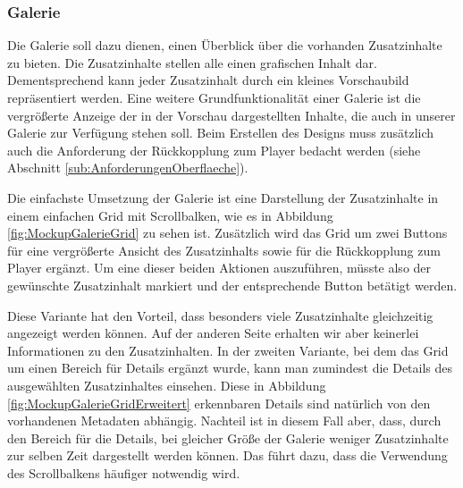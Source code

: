 

\subsubsection{Galerie}
Die Galerie soll dazu dienen, einen Überblick über die vorhanden Zusatzinhalte zu bieten. Die Zusatzinhalte stellen alle einen grafischen Inhalt dar. Dementsprechend kann jeder Zusatzinhalt durch ein kleines Vorschaubild repräsentiert werden. 
Eine weitere Grundfunktionalität einer Galerie ist die vergrößerte Anzeige der in der Vorschau dargestellten Inhalte, die auch in unserer Galerie zur Verfügung stehen soll. Beim Erstellen des Designs muss zusätzlich auch die Anforderung der Rückkopplung zum Player bedacht werden (siehe Abschnitt \ref{sub:AnforderungenOberflaeche}). 

Die einfachste Umsetzung der Galerie ist eine Darstellung der Zusatzinhalte in einem einfachen Grid  mit Scrollbalken, wie es in Abbildung \ref{fig:MockupGalerieGrid} zu sehen ist. Zusätzlich wird das Grid um zwei Buttons für eine vergrößerte Ansicht des Zusatzinhalts sowie für die Rückkopplung zum Player ergänzt. Um eine dieser beiden Aktionen auszuführen, müsste also der gewünschte Zusatzinhalt markiert und der entsprechende Button betätigt werden.


Diese Variante hat den Vorteil, dass besonders viele Zusatzinhalte gleichzeitig angezeigt werden können. Auf der anderen Seite erhalten wir aber keinerlei Informationen zu den Zusatzinhalten. In der zweiten Variante, bei dem das Grid um einen Bereich für Details ergänzt wurde, kann man zumindest die Details des ausgewählten Zusatzinhaltes einsehen. Diese in Abbildung \ref{fig:MockupGalerieGridErweitert} erkennbaren Details sind natürlich von den vorhandenen Metadaten abhängig. Nachteil ist in diesem Fall aber, dass, durch den Bereich für die Details, bei gleicher Größe der Galerie weniger Zusatzinhalte zur selben Zeit dargestellt werden können. Das führt dazu, dass die Verwendung des Scrollbalkens häufiger notwendig wird.

